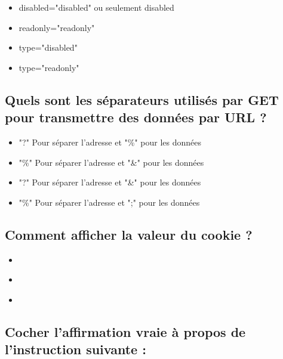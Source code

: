 \documentclass[11pt,a4paper]{article}
\begin{document}
\begin{itemize}
\item[\CaseCoche] disabled="disabled" ou seulement disabled \\
\item[\CaseCoche] readonly="readonly" \\
\item[\CaseCoche] type="disabled" \\
\item[\CaseCoche] type="readonly" \\
\end{itemize}


\subsection{Quels sont les séparateurs utilisés par GET pour transmettre des données par URL ?}

\begin{itemize}
\item[\CaseCoche] "?" Pour séparer l'adresse et "\%" pour les données \\
\item[\CaseCoche] "\%" Pour séparer l'adresse et "\&" pour les données \\
\item[\CaseCoche] "?" Pour séparer l'adresse et "\&" pour les données \\
\item[\CaseCoche] "\%" Pour séparer l'adresse et ";" pour les données \\
\end{itemize}


\subsection{Comment afficher la valeur du cookie  ?}

\begin{itemize}
\item[\CaseCoche]  \\
\item[\CaseCoche]  \\
\item[\CaseCoche]  \\
\end{itemize}


\subsection{Cocher l'affirmation vraie à propos de l'instruction suivante :}
\end{document}
